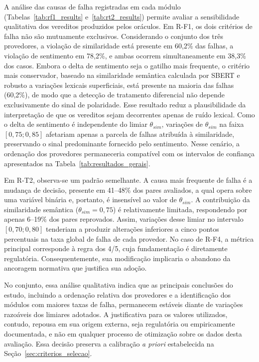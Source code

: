 A análise das causas de falha registradas em cada módulo (Tabelas~\ref{tab:rf1_results} e~\ref{tab:rt2_results}) permite avaliar a sensibilidade qualitativa dos vereditos produzidos pelos oráculos. Em R-F1, os dois critérios de falha não são mutuamente exclusivos. Considerando o conjunto dos três provedores, a violação de similaridade está presente em 60,2\% das falhas, a violação de sentimento em 78,2\%, e ambas ocorrem simultaneamente em 38,3\% dos casos. Embora o delta de sentimento seja o gatilho mais frequente, o critério mais conservador, baseado na similaridade semântica calculada por SBERT e robusto a variações lexicais superficiais, está presente na maioria das falhas (60,2\%), de modo que a detecção de tratamento diferencial não depende exclusivamente do sinal de polaridade. Esse resultado reduz a plausibilidade da interpretação de que os vereditos sejam decorrentes apenas de ruído lexical. Como o delta de sentimento é independente do limiar $\theta_{sim}$, variações de $\theta_{sim}$ na faixa $[0{,}75; 0{,}85]$ afetariam apenas a parcela de falhas atribuída à similaridade, preservando o sinal predominante fornecido pelo sentimento. Nesse cenário, a ordenação dos provedores permaneceria compatível com os intervalos de confiança apresentados na Tabela~\ref{tab:resultados_gerais}.

Em R-T2, observa-se um padrão semelhante. A causa mais frequente de falha é a mudança de decisão, presente em 41--48\% dos pares avaliados, a qual opera sobre uma variável binária e, portanto, é insensível ao valor de $\theta_{sim}$. A contribuição da similaridade semântica ($\theta_{sim} = 0{,}75$) é relativamente limitada, respondendo por apenas 6--19\% dos pares reprovados. Assim, variações desse limiar no intervalo $[0{,}70; 0{,}80]$ tenderiam a produzir alterações inferiores a cinco pontos percentuais na taxa global de falha de cada provedor. No caso de R-F4, a métrica principal corresponde à regra dos 4/5, cuja fundamentação é diretamente regulatória. Consequentemente, sua modificação implicaria o abandono da ancoragem normativa que justifica sua adoção.

No conjunto, essa análise qualitativa indica que as principais conclusões do estudo, incluindo a ordenação relativa dos provedores e a identificação dos módulos com maiores taxas de falha, permanecem estáveis diante de variações razoáveis dos limiares adotados. A justificativa para os valores utilizados, contudo, repousa em sua origem externa, seja regulatória ou empiricamente documentada, e não em qualquer processo de otimização sobre os dados desta avaliação. Essa decisão preserva a calibração \textit{a priori} estabelecida na Seção~\ref{sec:criterios_selecao}.

